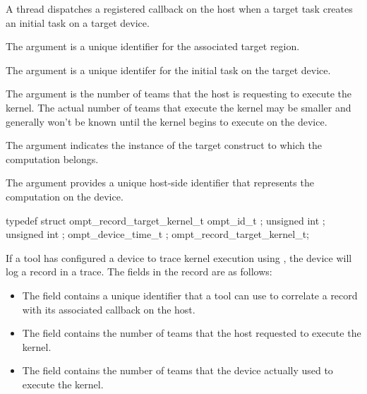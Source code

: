\begin{itemize}
\begin{itemize}
\descr
A thread dispatches a registered  callback on the host when
a target task creates an initial task on a target device.

\argdesc

The argument  is a unique identifier for the
associated target region.

The argument  is a unique identifer for the
initial task on the target device.

The argument  is the number of teams that the host is requesting to
execute the kernel. The actual number of teams that execute the kernel may be smaller and generally won't be
known until the kernel begins to execute on the device.

\constraints

The argument  indicates the instance of the
target construct to which the computation belongs.

The argument  provides a unique host-side
identifier that represents the computation on the device.

\record

\begin{ccppspecific}
\begin{omptRecord}
typedef struct ompt_record_target_kernel_t {
  ompt_id_t ;
  unsigned int ;
  unsigned int ;
  ompt_device_time_t ;
} ompt_record_target_kernel_t;
\end{omptRecord}
\end{ccppspecific}



If a tool has configured a device to trace kernel execution using ,
the device will log a  record in a trace. The fields in the record
are as follows:

\begin{itemize}
\item The  field contains a unique identifier that a tool can use to correlate a
 record with its associated  callback
on the host.

\item The  field contains the number of teams that the host requested to execute the kernel.

\item The  field contains the number of teams that the device actually used to execute the kernel.


\end{itemize}
\end{itemize}
\end{itemize}
